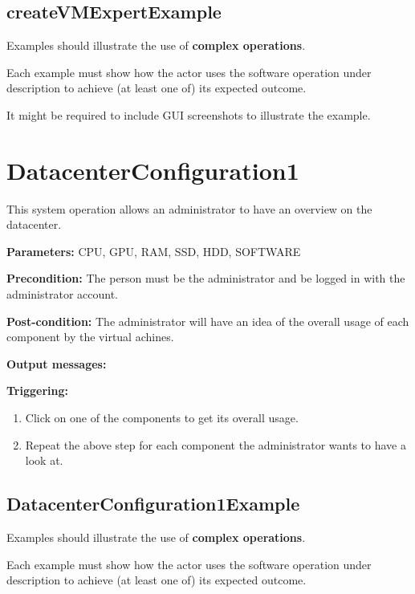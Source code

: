  
\subsection{createVMExpertExample}
Examples should illustrate the use of \textbf{complex operations}.

Each example must show how the actor uses the software operation under
description to achieve (at least one of) its expected outcome.

It might be required to include GUI screenshots to illustrate the example.






\section{DatacenterConfiguration1}
\label{operation:datacenterconfiguration}
This system operation allows an administrator to have an overview on the
datacenter.

\begin{description}

\item \textbf{Parameters:} CPU, GPU, RAM, SSD, HDD, SOFTWARE
\item \textbf{Precondition:} The person must be the administrator and be logged
in with the administrator account.
\item \textbf{Post-condition:} The administrator will have an idea of the
overall usage of each component by the virtual achines.
\item \textbf{Output messages:}

\item \textbf{Triggering:}
\begin{enumerate}
\item Click on one of the components to get its overall usage.
\item Repeat the above step for each component the administrator wants to have a
look at.
\end{enumerate}

 
\end{description}

 
\subsection{DatacenterConfiguration1Example}
Examples should illustrate the use of \textbf{complex operations}.

Each example must show how the actor uses the software operation under
description to achieve (at least one of) its expected outcome.

